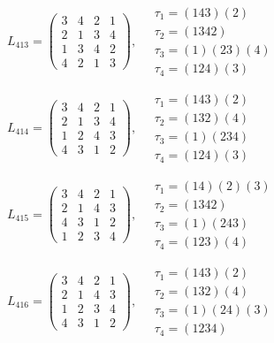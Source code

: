 $L_{413} = \begin{pmatrix} 3 & 4 & 2 & 1 \\ 2 & 1 & 3 & 4 \\ 1 & 3 & 4 & 2 \\ 4 & 2 & 1 & 3 \end{pmatrix}, \quad \begin{matrix} \tau_{1} = (1 4 3)(2) \\ \tau_{2} = (1 3 4 2) \\ \tau_{3} = (1)(2 3)(4) \\ \tau_{4} = (1 2 4)(3) \end{matrix}$

$L_{414} = \begin{pmatrix} 3 & 4 & 2 & 1 \\ 2 & 1 & 3 & 4 \\ 1 & 2 & 4 & 3 \\ 4 & 3 & 1 & 2 \end{pmatrix}, \quad \begin{matrix} \tau_{1} = (1 4 3)(2) \\ \tau_{2} = (1 3 2)(4) \\ \tau_{3} = (1)(2 3 4) \\ \tau_{4} = (1 2 4)(3) \end{matrix}$

$L_{415} = \begin{pmatrix} 3 & 4 & 2 & 1 \\ 2 & 1 & 4 & 3 \\ 4 & 3 & 1 & 2 \\ 1 & 2 & 3 & 4 \end{pmatrix}, \quad \begin{matrix} \tau_{1} = (1 4)(2)(3) \\ \tau_{2} = (1 3 4 2) \\ \tau_{3} = (1)(2 4 3) \\ \tau_{4} = (1 2 3)(4) \end{matrix}$

$L_{416} = \begin{pmatrix} 3 & 4 & 2 & 1 \\ 2 & 1 & 4 & 3 \\ 1 & 2 & 3 & 4 \\ 4 & 3 & 1 & 2 \end{pmatrix}, \quad \begin{matrix} \tau_{1} = (1 4 3)(2) \\ \tau_{2} = (1 3 2)(4) \\ \tau_{3} = (1)(2 4)(3) \\ \tau_{4} = (1 2 3 4) \end{matrix}$

